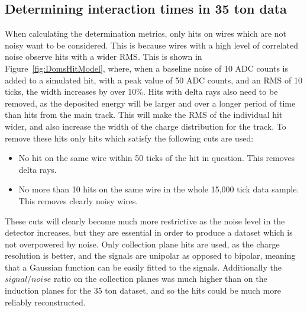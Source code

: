 \subsection{Determining interaction times in 35 ton data}
When calculating the determination metrics, only hits on wires which are not noisy want to be considered. This is because wires with a high level of correlated noise observe hits with a wider RMS. This is shown in Figure~\ref{fig:DomsHitModel}, where, when a baseline noise of 10 ADC counts is added to a simulated hit, with a peak value of 50 ADC counts, and an RMS of 10 ticks, the width increases by over 10\%. Hits with delta rays also need to be removed, as the deposited energy will be larger and over a longer period of time than hits from the main track. This will make the RMS of the individual hit wider, and also increase the width of the charge distribution for the track. To remove these hits only hits which satisfy the following cuts are used:
\begin{itemize}
\item No hit on the same wire within 50 ticks of the hit in question. This removes delta rays.
\item No more than 10 hits on the same wire in the whole 15,000 tick data sample. This removes clearly noisy wires.
\end{itemize}
These cuts will clearly become much more restrictive as the noise level in the detector increases, but they are essential in order to produce a dataset which is not overpowered by noise. Only collection plane hits are used, as the charge resolution is better, and the signals are unipolar as opposed to bipolar, meaning that a Gaussian function can be easily fitted to the signals. Additionally the $signal/noise$ ratio on the collection planes was much higher than on the induction planes for the 35 ton dataset, and so the hits could be much more reliably reconstructed. \\

